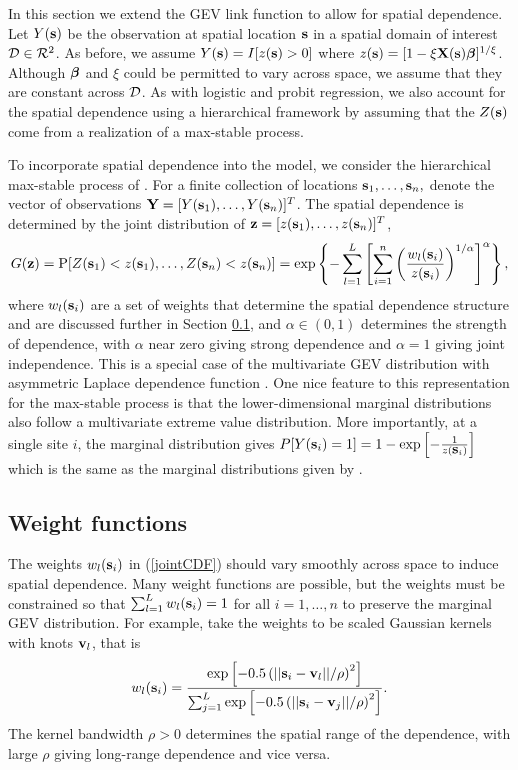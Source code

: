 \documentclass[11pt]{article}
\begin{document}
In this section we extend the GEV link function to allow for spatial dependence.
Let $Y(\mbox{\bf s})$ be the observation at spatial location $\mbox{\bf s}$ in a spatial domain of interest ${\cal D} \in {\cal R}^2$.
As before, we assume $Y(\mbox{\bf s}) = I[z(\mbox{\bf s}) > 0]$ where $z(\mbox{\bf s}) = [1 - \xi \mbox{\bf X}(\mbox{\bf s}) \mbox{\boldmath $\beta$}]^{1 / \xi}$.
Although $\mbox{\boldmath $\beta$}$ and $\xi$ could be permitted to vary across space, we assume that they are constant across ${\cal D}$.
As with logistic and probit regression, we also account for the spatial dependence using a hierarchical framework by assuming that the $Z(\mbox{\bf s})$ come from a realization of a max-stable process.

To incorporate spatial dependence into the model, we consider the hierarchical max-stable process of \citet{Reich2012}.
For a finite collection of locations $\mbox{\bf s}_1, \ldots, \mbox{\bf s}_n,$ denote the vector of observations $\mbox{\bf Y} = [Y(\mbox{\bf s}_1), \ldots, Y(\mbox{\bf s}_n)]^T$.
The spatial dependence is determined by the joint distribution of $\mbox{\bf z} = [z(\mbox{\bf s}_1),\ldots, z(\mbox{\bf s}_n)]^T$,
\begin{align}\label{jointCDF}
  G(\mbox{\bf z}) = \mbox{P}[Z(\mbox{\bf s}_1) < z(\mbox{\bf s}_1), \ldots, Z(\mbox{\bf s}_n) < z(\mbox{\bf s}_n)] = \exp\left\{-\sum_{l=1}^L\left[\sum_{i=1}^n\left(\frac{w_{l}(\mbox{\bf s}_i)}{z(\mbox{\bf s}_i)}\right)^{1/\alpha}\right]^{\alpha}\right\},
\end{align}
where $w_{l}(\mbox{\bf s}_i)$ are a set of weights that determine the spatial dependence structure and are discussed further in Section \ref{s:weights}, and $\alpha\in(0,1)$ determines the strength of dependence, with $\alpha$ near zero giving strong dependence and $\alpha=1$ giving joint independence.
This is a special case of the multivariate GEV distribution with asymmetric Laplace dependence function \citep{Tawn1990}.
One nice feature to this representation for the max-stable process is that the lower-dimensional marginal distributions also follow a multivariate extreme value distribution.
More importantly, at a single site $i$, the marginal distribution gives \mbox{$P[Y(\mbox{\bf s}_i) = 1] = 1 - \exp\left[ -\frac{ 1 }{ z(\mbox{\bf s}_i)} \right]$} which is the same as the marginal distributions given by \citet{Wang2010}.

\subsection{Weight functions}\label{s:weights}
The weights $w_{l}(\mbox{\bf s}_i)$ in (\ref{jointCDF}) should vary smoothly across space to induce spatial dependence.
Many weight functions are possible, but the weights must be constrained so that $\sum_{l=1}^L w_{l}(\mbox{\bf s}_i)=1$ for all $i=1,\ldots,n$ to preserve the marginal GEV distribution.
For example, \cite{Reich2012} take the weights to be scaled Gaussian kernels with knots $\mbox{\bf v}_l$, that is
\begin{align}\label{w}
   w_{l}(\mbox{\bf s}_i) = \frac{\exp\left[-0.5\left(||\mbox{\bf s}_i-\mbox{\bf v}_l||/\rho\right)^2\right]}
                 {\sum_{j=1}^L\exp\left[-0.5\left(||\mbox{\bf s}_i-\mbox{\bf v}_j||/\rho\right)^2\right]}.
\end{align}
The kernel bandwidth $\rho>0$ determines the spatial range of the dependence, with large $\rho$ giving long-range dependence and vice versa.
\end{document}
